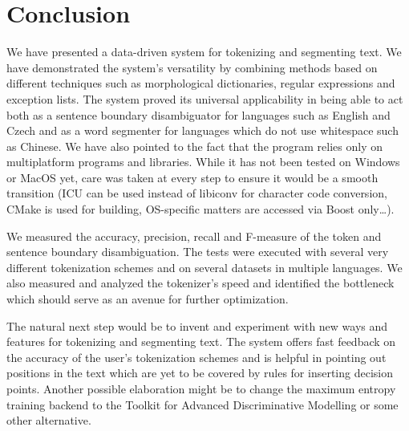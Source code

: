 \chapter*{Conclusion}

We have presented a data-driven system for tokenizing and segmenting text. We
have demonstrated the system's versatility by combining methods based on
different techniques such as morphological dictionaries, regular expressions
and exception lists. The system proved its universal applicability in being
able to act both as a sentence boundary disambiguator for languages such as
English and Czech and as a word segmenter for languages which do not use
whitespace such as Chinese. We have also pointed to the fact that the program
relies only on multiplatform programs and libraries. While it has not been
tested on Windows or MacOS yet, care was taken at every step to ensure it would
be a smooth transition (ICU can be used instead of libiconv for character code
conversion, CMake is used for building, OS-specific matters are accessed via
Boost only\ldots).

We measured the accuracy, precision, recall and F-measure of the token and
sentence boundary disambiguation. The tests were executed with several very
different tokenization schemes and on several datasets in multiple languages.
We also measured and analyzed the tokenizer's speed and identified the
bottleneck which should serve as an avenue for further optimization.

The natural next step would be to invent and experiment with new ways and
features for tokenizing and segmenting text. The system offers fast feedback on
the accuracy of the user's tokenization schemes and is helpful in pointing out
positions in the text which are yet to be covered by rules for inserting
decision points. Another possible elaboration might be to change the maximum
entropy training backend to the Toolkit for Advanced Discriminative Modelling
or some other alternative.
